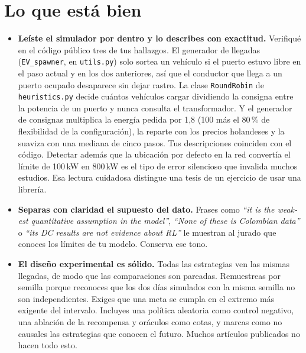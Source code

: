 \documentclass[11pt]{article}
\begin{document}
\section{Lo que está bien}

\begin{itemize}[leftmargin=1.2em,itemsep=5pt]
\item \textbf{Leíste el simulador por dentro y lo describes con exactitud.} Verifiqué en el código público tres de tus hallazgos. El generador de llegadas (\texttt{EV\_spawner}, en \texttt{utils.py}) solo sortea un vehículo si el puerto estuvo libre en el paso actual y en los dos anteriores, así que el conductor que llega a un puerto ocupado desaparece sin dejar rastro. La clase \texttt{RoundRobin} de \texttt{heuristics.py} decide cuántos vehículos cargar dividiendo la consigna entre la potencia de un puerto y nunca consulta el transformador. Y el generador de consignas multiplica la energía pedida por 1,8 (100 más el 80\,\% de flexibilidad de la configuración), la reparte con los precios holandeses y la suaviza con una mediana de cinco pasos. Tus descripciones coinciden con el código. Detectar además que la ubicación por defecto en la red convertía el límite de 100\,kW en 800\,kW es el tipo de error silencioso que invalida muchos estudios. Esa lectura cuidadosa distingue una tesis de un ejercicio de usar una librería.

\item \textbf{Separas con claridad el supuesto del dato.} Frases como \foreignlanguage{english}{\emph{``it is the weakest quantitative assumption in the model''}}, \foreignlanguage{english}{\emph{``None of these is Colombian data''}} o \foreignlanguage{english}{\emph{``its DC results are not evidence about RL''}} le muestran al jurado que conoces los límites de tu modelo. Conserva ese tono.

\item \textbf{El diseño experimental es sólido.} Todas las estrategias ven las mismas llegadas, de modo que las comparaciones son pareadas. Remuestreas por semilla porque reconoces que los dos días simulados con la misma semilla no son independientes. Exiges que una meta se cumpla en el extremo más exigente del intervalo. Incluyes una política aleatoria como control negativo, una ablación de la recompensa y oráculos como cotas, y marcas como no causales las estrategias que conocen el futuro. Muchos artículos publicados no hacen todo esto.


\end{itemize}
\end{document}

